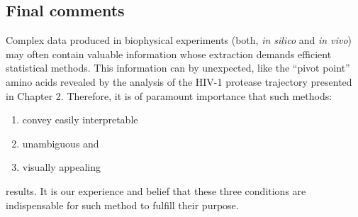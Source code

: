 \documentclass[a4paper,11pt,twoside]{book}%
\begin{document}
\subsection{Final comments}

Complex data produced in biophysical experiments (both, \emph{in silico} and \emph{in vivo}) may often contain valuable information whose extraction demands efficient statistical methods.
This information can by unexpected, like the ``pivot point'' amino acids revealed by the analysis of the HIV-1 protease trajectory presented in Chapter 2.
Therefore, it is of paramount importance that such methods:
\begin{enumerate}
 \item convey easily interpretable
 \item unambiguous and
 \item visually appealing
\end{enumerate}
results.
It is our experience and belief that these three conditions are indispensable for such method to fulfill their purpose.
\end{document}
